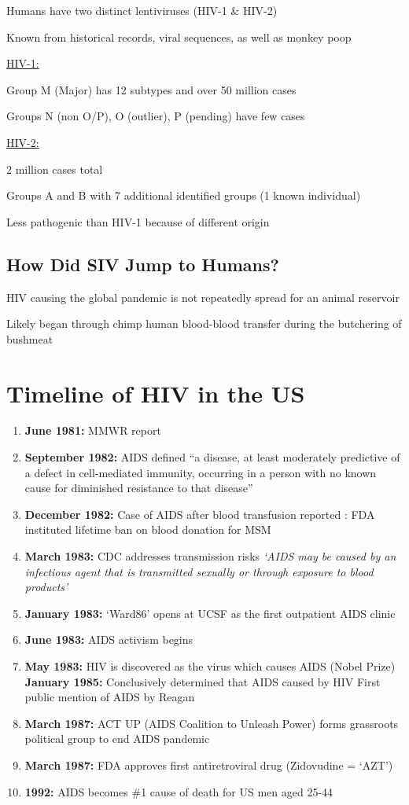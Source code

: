 \documentclass{notes}
\begin{document}
Humans have two distinct lentiviruses (HIV-1 \& HIV-2)

Known from historical records, viral sequences, as well as monkey poop

\ul{HIV-1:}

Group M (Major) has 12 subtypes and over 50 million cases

Groups N (non O/P), O (outlier), P (pending) have few cases

\ul{HIV-2:}

2 million cases total

Groups A and B with 7 additional identified groups (1 known individual)

Less pathogenic than HIV-1 because of different origin

\subsection{How Did SIV Jump to Humans?}

HIV causing the global pandemic is not repeatedly spread for an animal reservoir

Likely began through chimp \indicates human blood-blood transfer during the butchering of bushmeat

\section{Timeline of HIV in the US}

\begin{enumerate}
    \item \textbf{June 1981:} MMWR report
    \item \textbf{September 1982:} AIDS defined
    \subitem ``a disease, at least moderately predictive of a defect in cell-mediated immunity, occurring in a person with no known cause for diminished resistance to that disease''
    \item \textbf{December 1982:} Case of AIDS after blood transfusion reported
    : FDA instituted lifetime ban on blood donation for MSM
    \item \textbf{March 1983:} CDC addresses transmission risks
    \subitem \textit{`AIDS may be caused by an infectious agent that is transmitted sexually or through exposure to blood products'}
    \item \textbf{January 1983:} `Ward86' opens at UCSF as the first outpatient AIDS clinic
    \item \textbf{June 1983:} AIDS activism begins
    \item \textbf{May 1983:} HIV is discovered as the virus which causes AIDS (Nobel Prize)
    \subitem \textbf{January 1985:} Conclusively determined that AIDS caused by HIV
     First public mention of AIDS by Reagan
    \item \textbf{March 1987:} ACT UP (AIDS Coalition to Unleash Power) forms grassroots political group to end AIDS pandemic
    \item \textbf{March 1987:} FDA approves first antiretroviral drug (Zidovudine = `AZT')
    \item \textbf{1992:} AIDS becomes \#1 cause of death for US men aged 25-44
\end{enumerate}
\end{document}
